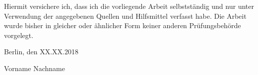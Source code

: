 
Hiermit versichere ich, dass ich die vorliegende Arbeit selbstständig und nur unter Verwendung der angegebenen Quellen und Hilfsmittel verfasst habe. Die Arbeit wurde bisher in gleicher oder ähnlicher Form keiner anderen Prüfungsbehörde vorgelegt.

\vskip 1cm

Berlin, den XX.XX.2018

\vskip 1.5cm

Vorname Nachname
